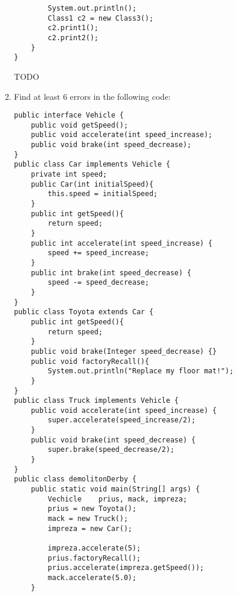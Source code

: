 \documentclass[11pt]{article}
\newenvironment{answer}{\large\lstset{basicstyle=\large}\color{white}}{}
\newenvironment{answer}{\large\lstset{basicstyle=\large}\color{red}}{}
\begin{document}
\begin{enumerate}
\begin{lstlisting}
		System.out.println();
		Class1 c2 = new Class3();
		c2.print1();
		c2.print2();
	}
}
\end{lstlisting}
    
    \begin{answer}
    \huge TODO
    \end{answer}

\pagebreak
\item Find at least 6 errors in the following code:
\begin{lstlisting}
public interface Vehicle {
	public void getSpeed();
	public void accelerate(int speed_increase);
	public void brake(int speed_decrease);
}
public class Car implements Vehicle {
	private int speed;
	public Car(int initialSpeed){
		this.speed = initialSpeed;
	}
	public int getSpeed(){
		return speed;
	}
	public int accelerate(int speed_increase) {
		speed += speed_increase;
	}
	public int brake(int speed_decrease) {
		speed -= speed_decrease;
	}
}
public class Toyota extends Car {
	public int getSpeed(){
		return speed;
	}
	public void brake(Integer speed_decrease) {}
	public void factoryRecall(){
		System.out.println("Replace my floor mat!");
	}
}
public class Truck implements Vehicle {
	public void accelerate(int speed_increase) {
		super.accelerate(speed_increase/2);
	}
	public void brake(int speed_decrease) {
		super.brake(speed_decrease/2);
	}
}
public class demolitonDerby {
	public static void main(String[] args) {
		Vechicle	prius, mack, impreza;
		prius = new Toyota();
		mack = new Truck();
		impreza = new Car();
		
		impreza.accelerate(5);
		prius.factoryRecall();
		prius.accelerate(impreza.getSpeed());
		mack.accelerate(5.0);
	}
\end{lstlisting}

\end{enumerate}
\end{document}
